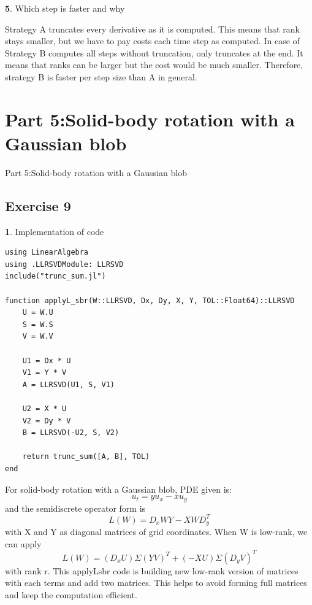 \documentclass[11pt]{article}
\begin{document}
\vspace{1.5em}

\textbf{5}. Which step is faster and why

\vspace{0.6em}

Strategy A truncates every derivative as it is computed. This means that rank stays smaller, but we have to pay costs each time step as computed. In case of Strategy B computes all steps without truncation, only truncates at the end. It means that ranks can be larger but the cost would be much smaller. Therefore, strategy B is faster per step size than A in general.

\section*{Part 5:Solid-body rotation with a Gaussian blob}
{Part 5:Solid-body rotation with a Gaussian blob}

\subsection*{Exercise 9}
\textbf{1}. Implementation of code

\begin{lstlisting}
using LinearAlgebra
using .LLRSVDModule: LLRSVD
include("trunc_sum.jl")

function applyL_sbr(W::LLRSVD, Dx, Dy, X, Y, TOL::Float64)::LLRSVD
    U = W.U
    S = W.S
    V = W.V

    U1 = Dx * U
    V1 = Y * V
    A = LLRSVD(U1, S, V1)

    U2 = X * U
    V2 = Dy * V
    B = LLRSVD(-U2, S, V2)

    return trunc_sum([A, B], TOL)  
end

\end{lstlisting}

For solid-body rotation with a Gaussian blob, PDE given is:
\[
u_t = yu_x - xu_y
\]
and the semidiscrete operator form is 
\[
L(W) = D_xWY -XWD_y^T
\]
with X and Y as diagonal matrices of grid coordinates.
When W is low-rank, we can apply 
\[
L(W) = (D_xU)\Sigma(YV)^T +(-XU)\Sigma(D_yV)^T
\]
with rank r. This applyL\-sbr code is building new low-rank version of matrices with each terms and add two matrices. This helps to avoid forming full matrices and keep the computation efficient.

\vspace{1.5em}
\end{document}
